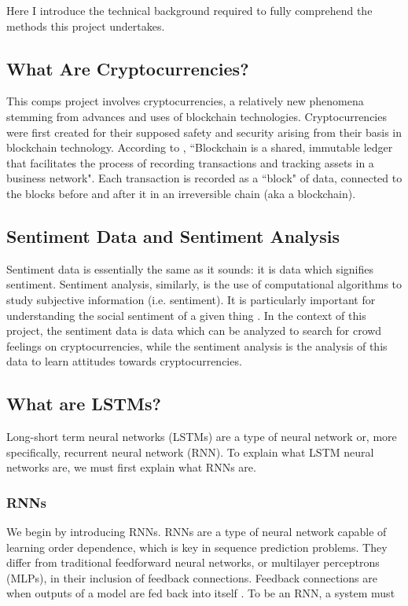 \documentclass[10pt,twocolumn]{article}
\begin{document}
Here I introduce the technical background required to fully comprehend the methods this project undertakes.

\subsection{What Are Cryptocurrencies?}

This comps project involves cryptocurrencies, a relatively new phenomena stemming from advances and uses of blockchain technologies. Cryptocurrencies were first created for their supposed safety and security arising from their basis in blockchain technology. According to , ``Blockchain is a shared, immutable ledger that facilitates the process of recording transactions and tracking assets in a business network". Each transaction is recorded as a ``block" of data, connected to the blocks before and after it in an irreversible chain (aka a blockchain).

\subsection{Sentiment Data and Sentiment Analysis}

Sentiment data is essentially the same as it sounds: it is data which signifies sentiment. Sentiment analysis, similarly, is the use of computational algorithms to study subjective information (i.e. sentiment). It is particularly important for understanding the social sentiment of a given thing \cite{SentimentAnalysisConcept}. In the context of this project, the sentiment data is data which can be analyzed to search for crowd feelings on cryptocurrencies, while the sentiment analysis is the analysis of this data to learn attitudes towards cryptocurrencies.

\subsection{What are LSTMs?}

Long-short term neural networks (LSTMs) are a type of neural network or, more specifically, recurrent neural network (RNN). To explain what LSTM neural networks are, we must first explain what RNNs are.

\subsubsection{RNNs}

We begin by introducing RNNs. RNNs are a type of neural network capable of learning order dependence, which is key in sequence prediction problems. They differ from traditional feedforward neural networks, or multilayer perceptrons (MLPs), in their inclusion of feedback connections. Feedback connections are when outputs of a model are fed back into itself \cite{DeepLearningFeedforward}. To be an RNN, a system must
\end{document}
